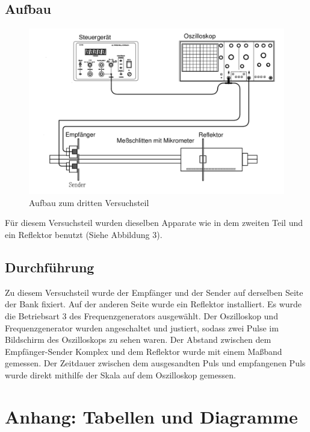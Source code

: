 \documentclass[11pt,a4paper]{article}
\begin{document}
\subsection{Aufbau}
\begin{figure}[h]
	\centering
	\includegraphics[scale=0.5]{Abb3}
	\caption{Aufbau zum dritten Versuchsteil}
\end{figure}
Für diesem Versuchsteil wurden dieselben Apparate wie in dem zweiten Teil und ein Reflektor benutzt (Siehe Abbildung 3). 

\subsection{Durchführung}
Zu diesem Versuchsteil wurde der Empfänger und der Sender auf derselben Seite der Bank fixiert. Auf der anderen Seite wurde ein Reflektor installiert. Es wurde die Betriebsart 3 des Frequenzgenerators ausgewählt. Der Oszilloskop und Frequenzgenerator wurden angeschaltet und justiert, sodass zwei Pulse im Bildschirm des Oszilloskops zu sehen waren. Der Abstand zwischen dem Empfänger-Sender Komplex und dem Reflektor wurde mit einem Maßband gemessen. Der Zeitdauer zwischen dem ausgesandten Puls und empfangenen Puls wurde direkt mithilfe der Skala auf dem Oszilloskop gemessen. 

\section{Anhang: Tabellen und Diagramme}
\end{document}
